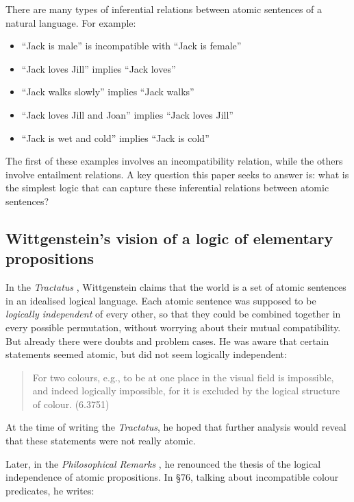 There are many types of inferential relations between atomic
sentences of a natural language.  For example:

\begin{itemize}

\item ``Jack is male'' is incompatible with ``Jack is female''
\item ``Jack loves Jill'' implies ``Jack loves''
\item ``Jack walks slowly'' implies ``Jack walks''
\item ``Jack loves Jill and Joan'' implies ``Jack loves Jill''
\item ``Jack is wet and cold'' implies ``Jack is cold''

\end{itemize}

\NI The first of these examples involves an incompatibility relation,
while the others involve entailment relations.  A key question this
paper seeks to answer is: what is the simplest logic that can capture
these inferential relations between atomic sentences?

\subsection{Wittgenstein's vision of a logic of elementary propositions}

\NI In the \emph{Tractatus} \cite{wittgenstein-tractatus}, Wittgenstein
claims that the world is a set of atomic sentences in an idealised
logical language.  Each atomic sentence was supposed to be
\emph{logically independent} of every other, so that they could be
combined together in every possible permutation, without worrying
about their mutual compatibility.
But already there were doubts and problem cases.  He was aware that
certain  statements seemed atomic, but did not seem logically
independent:

\begin{quote}
  For two colours, e.g., to be at one place in the visual field is
  impossible, and indeed logically impossible, for it is excluded by
  the logical structure of colour. (6.3751)
\end{quote}

\NI At the time of writing the \emph{Tractatus}, he hoped that further
analysis would reveal that these statements were not really atomic.

Later, in the \emph{Philosophical Remarks} \cite{wittgenstein-remarks}, he
renounced the thesis of the logical independence of atomic
propositions.  In \S 76, talking about incompatible colour predicates,
he writes:

